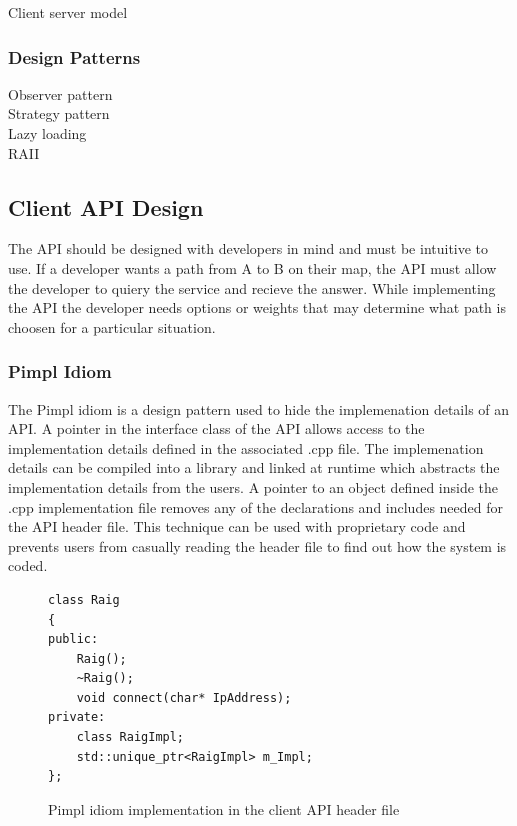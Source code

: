 \documentclass[12pt,a4paper,titlepage]{article}
\begin{document}
Client server model\\

\subsubsection{Design Patterns}
Observer pattern\\
Strategy pattern\\
Lazy loading\\
RAII\\

\subsection{Client API Design}
\label{section:clientapidesign}

The API should be designed with developers in mind and must be intuitive to use. If a developer wants a path from A to B on their map, the API must allow the developer to quiery the service and recieve the answer. While implementing the API the developer needs options or weights that may determine what path is choosen for a particular situation. 

\subsubsection{Pimpl Idiom}

The Pimpl idiom is a design pattern used to hide the implemenation details of an API. A pointer in the interface class of the API allows access to the implementation details defined in the associated .cpp file. The implemenation details can be compiled into a library and linked at runtime which abstracts the implementation details from the users. A pointer to an object defined inside the .cpp implementation file removes any of the declarations and includes needed for the API header file. This technique can be used with proprietary code and prevents users from casually reading the header file to find out how the system is coded. 

\begin{figure}[H]
\begin{lstlisting}
class Raig
{
public:
	Raig();
	~Raig();
	void connect(char* IpAddress);
private:
	class RaigImpl; 
	std::unique_ptr<RaigImpl> m_Impl;
};
\end{lstlisting}
	\caption{Pimpl idiom implementation in the client API header file}
	\label{code:pimplidiom}
\end{figure}
\end{document}
